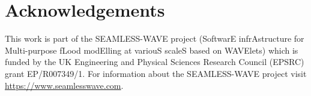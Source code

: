 \section*{Acknowledgements}

This work is part of the SEAMLESS-WAVE project (SoftwarE infrAstructure for Multi-purpose fLood modElling at variouS scaleS based on WAVElets) which is funded by the UK Engineering and Physical Sciences Research Council (EPSRC) grant EP/R007349/1.
For information about the SEAMLESS-WAVE project visit \url{https://www.seamlesswave.com}.
